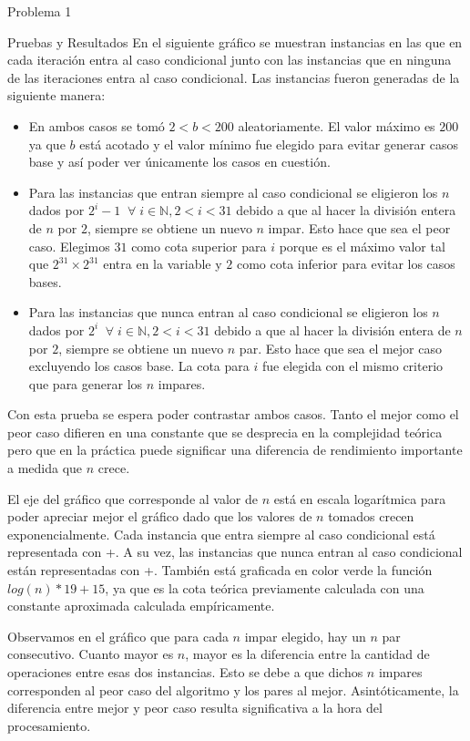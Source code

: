 \begin{section}{Problema 1}
\begin{subsection}{Pruebas y Resultados}
En el siguiente gráfico se muestran instancias en las que en cada iteración entra al caso condicional junto con las instancias que en ninguna de las iteraciones entra al caso condicional. Las instancias fueron generadas de la siguiente manera:
\begin{itemize}
	\item En ambos casos se tomó $2 < b < 200$ aleatoriamente. El valor máximo es $200$ ya que $b$ está acotado y el valor mínimo fue elegido para evitar generar casos base y así poder ver únicamente los casos en cuestión.
	\item Para las instancias que entran siempre al caso condicional se eligieron los $n$ dados por $2^i-1\;\;\forall\; i\in\mathbb{N}, 2 < i < 31$ debido a que al hacer la división entera de $n$ por $2$, siempre se obtiene un nuevo $n$ impar. Esto hace que sea el peor caso. Elegimos $31$ como cota superior para $i$ porque es el máximo valor tal que $2^{31} \times 2^{31}$ entra en la variable y $2$ como cota inferior para evitar los casos bases.
	\item Para las instancias que nunca entran al caso condicional se eligieron los $n$ dados por $2^i\;\;\forall\; i\in\mathbb{N}, 2 < i < 31$ debido a que al hacer la división entera de $n$ por $2$, siempre se obtiene un nuevo $n$ par. Esto hace que sea el mejor caso excluyendo los casos base. La cota para $i$ fue elegida con el mismo criterio que para generar los $n$ impares.
\end{itemize}

	Con esta prueba se espera poder contrastar ambos casos. Tanto el mejor como el peor caso difieren en una constante que se desprecia en la complejidad teórica pero que en la práctica puede significar una diferencia de rendimiento importante a medida que $n$ crece.

El eje del gráfico que corresponde al valor de $n$ está en escala logarítmica para poder apreciar mejor el gráfico dado que los valores de $n$ tomados crecen exponencialmente. Cada instancia que entra siempre al caso condicional está representada con {\color{red}+}. A su vez, las instancias que nunca entran al caso condicional están representadas con {\color{blue}+}. También está graficada en color verde la función $log(n)*19+15$, ya que es la cota teórica previamente calculada con una constante aproximada calculada empíricamente.\VSP

		\VSP

Observamos en el gráfico que para cada $n$ impar elegido, hay un $n$ par consecutivo. Cuanto mayor es $n$, mayor es la diferencia entre la cantidad de operaciones entre esas dos instancias. Esto se debe a que dichos $n$ impares corresponden al peor caso del algoritmo y los pares al mejor. Asintóticamente, la diferencia entre mejor y peor caso resulta significativa a la hora del procesamiento.


\end{subsection}
\end{section}
